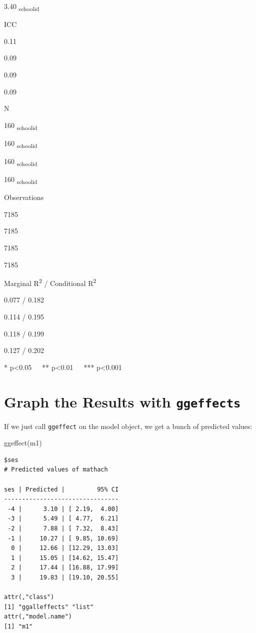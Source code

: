 \documentclass[
  letterpaper,
  DIV=11,
  numbers=noendperiod]{scrreprt}
\newenvironment{Shaded}{\begin{snugshade}}{\end{snugshade}}
\newcommand{\FunctionTok}[1]{\textcolor[rgb]{0.02,0.16,0.49}{#1}}
\newcommand{\NormalTok}[1]{\textcolor[rgb]{0.00,0.44,0.13}{#1}}
\begin{document}
3.40 \textsubscript{schoolid}

ICC

0.11

0.09

0.09

0.09

N

160 \textsubscript{schoolid}

160 \textsubscript{schoolid}

160 \textsubscript{schoolid}

160 \textsubscript{schoolid}

Observations

7185

7185

7185

7185

Marginal R\textsuperscript{2} / Conditional R\textsuperscript{2}

0.077 / 0.182

0.114 / 0.195

0.118 / 0.199

0.127 / 0.202

* p\textless0.05~~~** p\textless0.01~~~*** p\textless0.001

\hypertarget{graph-the-results-with-ggeffects}{%
\section{\texorpdfstring{Graph the Results with
\texttt{ggeffects}}{Graph the Results with ggeffects}}\label{graph-the-results-with-ggeffects}}

If we just call \texttt{ggeffect} on the model object, we get a bunch of
predicted values:

\begin{Shaded}
\begin{Highlighting}[]
\FunctionTok{ggeffect}\NormalTok{(m1)}
\end{Highlighting}
\end{Shaded}

\begin{verbatim}
$ses
# Predicted values of mathach

ses | Predicted |         95% CI
--------------------------------
 -4 |      3.10 | [ 2.19,  4.00]
 -3 |      5.49 | [ 4.77,  6.21]
 -2 |      7.88 | [ 7.32,  8.43]
 -1 |     10.27 | [ 9.85, 10.69]
  0 |     12.66 | [12.29, 13.03]
  1 |     15.05 | [14.62, 15.47]
  2 |     17.44 | [16.88, 17.99]
  3 |     19.83 | [19.10, 20.55]

attr(,"class")
[1] "ggalleffects" "list"        
attr(,"model.name")
[1] "m1"
\end{verbatim}
\end{document}

